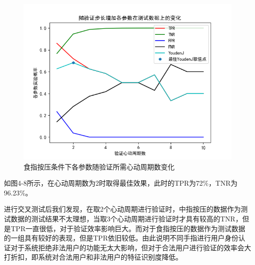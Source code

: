 \begin{figure}[H]
  \centering
  \includegraphics[width=0.7\linewidth]{images/zhongzhi.png}
  \caption{食指按压条件下各参数随验证所需心动周期数变化}\label{4-8} %
\end{figure}
\par
{如图4-8所示，在心动周期数为2时取得最佳效果，此时的TPR为72\%，TNR为96.23\%。}
\par
{进行交叉测试后我们发现，在取2个心动周期进行验证时，中指按压的数据作为测试数据的测试结果不太理想，当取3个心动周期进行验证时才具有较高的TNR，但是TPR一直很低，对于验证效率影响巨大。而对于食指按压的数据作为测试数据的一组具有较好的表现，但是TPR依旧较低。由此说明不同手指进行用户身份认证对于系统拒绝非法用户的功能无太大影响，但对于合法用户进行验证的效率会大打折扣，即系统对合法用户和非法用户的特征识别度降低。}













